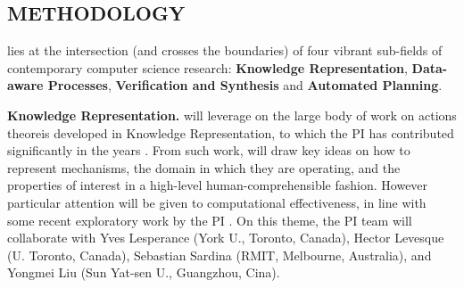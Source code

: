 







\subsection*{METHODOLOGY}

\project lies at the intersection (and crosses the boundaries) of four
vibrant sub-fields of contemporary computer science research:
\textbf{Knowledge Representation}, \textbf{Data-aware Processes},
\textbf{Verification and Synthesis } and \textbf{Automated Planning}.


\textbf{Knowledge Representation.}  \project will leverage on the large
body of work on actions theoreis developed in Knowledge
Representation, to which the PI has contributed significantly in the
years
\cite{DeGiacomoRS98,DeGiacomoLL00,DeGiacomoLS01,SardinaGLL04,SardinaG09,DeGiacomoLP10,DeGiacomoLM12,DeGiacomoLPV14,DeGiacomoLPV16,BanihashemiGL17}. From
such work, \project will draw key ideas on how to represent
mechanisms, the domain in which they are operating, and the properties
of interest in a high-level human-comprehensible fashion. However
particular attention will be given to computational effectiveness, in
line with some recent exploratory work by the PI
\cite{DeGLP16,DeGiacomoLPS16,CDMP17}.  On this theme, the PI team will
collaborate with Yves Lesperance (York U., Toronto, Canada), Hector
Levesque (U. Toronto, Canada), Sebastian Sardina (RMIT, Melbourne,
Australia), and Yongmei Liu (Sun Yat-sen U., Guangzhou, Cina).


